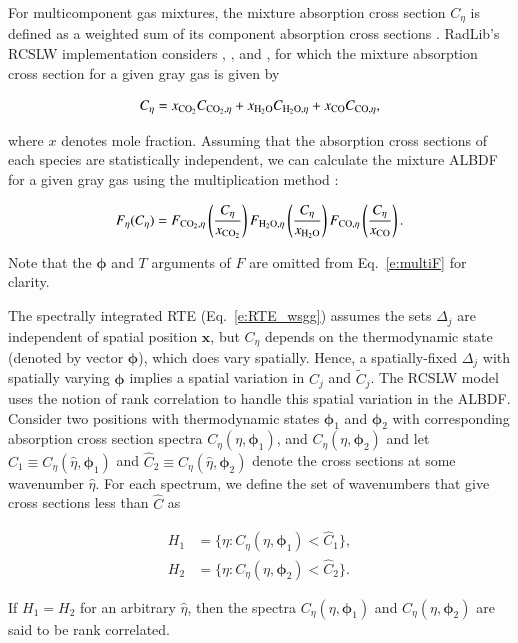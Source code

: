 \documentclass[preprint,12pt]{elsarticle}
\newcommand{\BS}{\boldsymbol}
\begin{document}
For multicomponent gas mixtures, the mixture absorption cross section $C_{\eta}$ is defined as a weighted sum of its component absorption cross sections \cite{Solovjov_2000}. RadLib's RCSLW implementation considers , , and , for which the mixture absorption cross section for a given gray gas is given by 
%
\begin{linenomath}
	\begin{equation} \label{e:multiC}
		C_{\eta} = x_{\ce{CO2}}C_{\ce{CO2},\eta} + x_{\ce{H2O}}C_{\ce{H2O},\eta} + x_{\ce{CO}}C_{\ce{CO},\eta},
	\end{equation}
\end{linenomath}
%
where $x$ denotes mole fraction.
Assuming that the absorption cross sections of each species are statistically independent, we can calculate the mixture ALBDF for a given gray gas using the multiplication method \cite{Solovjov_2000}:
%
\begin{linenomath}
\begin{equation} \label{e:multiF}
    F_{\eta}(C_{\eta}) = F_{\ce{CO2},\eta} \left( \frac{C_{\eta}}{x_{\ce{CO2}}} \right) F_{\ce{H2O},\eta} \left( \frac{C_{\eta}}{x_{\ce{H2O}}} \right) F_{\ce{CO},\eta} \left( \frac{C_{\eta}}{x_{\ce{CO}}} \right). 
\end{equation}
\end{linenomath}
%
Note that the $\BS{\phi}$ and $T$ arguments of $F$ are omitted from Eq.~\ref{e:multiF} for clarity.

The spectrally integrated RTE (Eq.~\ref{e:RTE_wsgg}) assumes the sets $\Delta_j$ are independent of spatial position $\mathbf{x}$, but $C_\eta$ depends on the thermodynamic state (denoted by vector $\BS{\phi}$), which does vary spatially.
Hence, a spatially-fixed $\Delta_j$ with spatially varying $\BS{\phi}$ implies a spatial variation in $C_j$ and $\tilde{C}_j$. 
The RCSLW model uses the notion of rank correlation to handle  this spatial variation in the ALBDF. 
Consider two positions with thermodynamic states $\BS{\phi}_1$ and $\BS{\phi}_2$ with corresponding absorption cross section spectra $C_\eta(\eta,\BS{\phi}_1)$, and $C_\eta(\eta,\BS{\phi}_2)$ and let $\hat{C}_1\equiv C_\eta(\hat{\eta},\BS{\phi}_1)$ and $\hat{C}_2\equiv C_\eta(\hat{\eta},\BS{\phi}_2)$ denote the cross sections at some wavenumber $\hat{\eta}$. For each spectrum, we define the set of wavenumbers that give cross sections less than $\hat{C}$ as
%
\begin{linenomath}
\begin{align}
    H_1&=\{\eta: C_\eta(\eta,\BS{\phi}_1)<\hat{C}_1\}, \\
    H_2&=\{\eta: C_\eta(\eta,\BS{\phi}_2)<\hat{C}_2\}.
    \end{align}
\end{linenomath}
%
If $H_1=H_2$ for an arbitrary $\hat{\eta}$, then the spectra $C_\eta(\eta,\BS{\phi}_1)$ and $C_\eta(\eta,\BS{\phi}_2)$ are said to be rank correlated.
\end{document}

